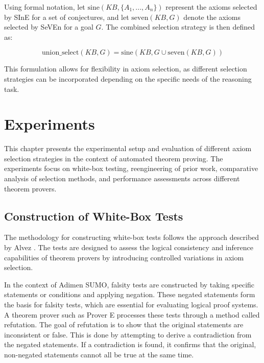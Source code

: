 \documentclass[english,version-2020-11]{uzl-thesis}
\begin{document}
Using formal notation, let \( \text{sine}(KB, \{A_1, ..., A_n\}) \) represent the axioms selected by SInE for a set of conjectures, and let \( \text{seven}(KB, G) \) denote the axioms selected by SeVEn for a goal \( G \). The combined selection strategy is then defined as:

\begin{definition}
    \begin{equation}
        \text{union\_select}(KB, G) = \text{sine}(KB, G \cup \text{seven}(KB, G))
    \end{equation}
\end{definition}

This formulation allows for flexibility in axiom selection, as different selection strategies can be incorporated depending on the specific needs of the reasoning task.


\chapter{Experiments}
\label{chapter-experiments}

This chapter presents the experimental setup and evaluation of different axiom selection strategies in the context of automated theorem proving. The experiments focus on white-box testing, reengineering of prior work, comparative analysis of selection methods, and performance assessments across different theorem provers.

\section{Construction of White-Box Tests}

The methodology for constructing white-box tests follows the approach described by Alvez \cite{Alvez2017}. The tests are designed to assess the logical consistency and inference capabilities of theorem provers by introducing controlled variations in axiom selection.

In the context of Adimen SUMO, falsity tests are constructed by taking specific statements or conditions and applying negation. These negated statements form the basis for falsity tests, which are essential for evaluating logical proof systems. A theorem prover such as Prover E processes these tests through a method called refutation. The goal of refutation is to show that the original statements are inconsistent or false. This is done by attempting to derive a contradiction from the negated statements. If a contradiction is found, it confirms that the original, non-negated statements cannot all be true at the same time.
\end{document}

